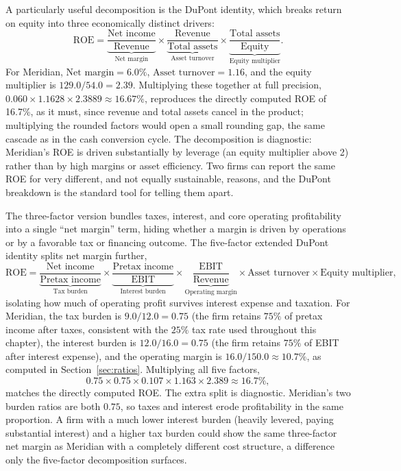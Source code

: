 \documentclass[../ai_in_finance]{subfiles}
\begin{document}
A particularly useful decomposition is the DuPont identity, which breaks return on equity into three economically distinct drivers:
\begin{equation}
\text{ROE} = \underbrace{\frac{\text{Net income}}{\text{Revenue}}}_{\text{Net margin}} \times \underbrace{\frac{\text{Revenue}}{\text{Total assets}}}_{\text{Asset turnover}} \times \underbrace{\frac{\text{Total assets}}{\text{Equity}}}_{\text{Equity multiplier}}.\label{eq:statements-dupont}
\end{equation}
For Meridian, $\text{Net margin} = 6.0\%$, $\text{Asset turnover} = 1.16$, and the equity multiplier is $129.0/54.0 = 2.39$. Multiplying these together at full precision, $0.060 \times 1.1628 \times 2.3889 \approx 16.67\%$, reproduces the directly computed ROE of 16.7\%, as it must, since revenue and total assets cancel in the product; multiplying the rounded factors would open a small rounding gap, the same cascade as in the cash conversion cycle. The decomposition is diagnostic: Meridian's ROE is driven substantially by leverage (an equity multiplier above 2) rather than by high margins or asset efficiency. Two firms can report the same ROE for very different, and not equally sustainable, reasons, and the DuPont breakdown is the standard tool for telling them apart.

The three-factor version bundles taxes, interest, and core operating profitability into a single ``net margin'' term, hiding whether a margin is driven by operations or by a favorable tax or financing outcome. The five-factor extended DuPont identity splits net margin further,
\begin{equation*}
\text{ROE} = \underbrace{\frac{\text{Net income}}{\text{Pretax income}}}_{\text{Tax burden}} \times \underbrace{\frac{\text{Pretax income}}{\text{EBIT}}}_{\text{Interest burden}} \times \underbrace{\frac{\text{EBIT}}{\text{Revenue}}}_{\text{Operating margin}} \times \text{Asset turnover} \times \text{Equity multiplier},
\end{equation*}
isolating how much of operating profit survives interest expense and taxation. For Meridian, the tax burden is $9.0/12.0 = 0.75$ (the firm retains $75\%$ of pretax income after taxes, consistent with the $25\%$ tax rate used throughout this chapter), the interest burden is $12.0/16.0 = 0.75$ (the firm retains $75\%$ of EBIT after interest expense), and the operating margin is $16.0/150.0 \approx 10.7\%$, as computed in Section~\ref{sec:ratios}. Multiplying all five factors,
\begin{equation*}
0.75 \times 0.75 \times 0.107 \times 1.163 \times 2.389 \approx 16.7\%,
\end{equation*}
matches the directly computed ROE. The extra split is diagnostic. Meridian's two burden ratios are both $0.75$, so taxes and interest erode profitability in the same proportion. A firm with a much lower interest burden (heavily levered, paying substantial interest) and a higher tax burden could show the same three-factor net margin as Meridian with a completely different cost structure, a difference only the five-factor decomposition surfaces.
\end{document}
